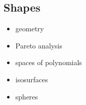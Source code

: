 \subsection{Shapes}
\label{sec:shapes}



\begin{itemize}
\item
  geometry
\item
  Pareto analysis
\item
  spaces of polynomials
\item
  isosurfaces
\item
  spheres
\end{itemize}

